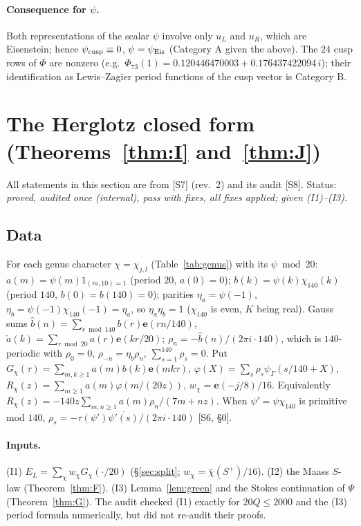 \documentclass[11pt]{article}
\theoremstyle{definition}
\theoremstyle{plain}
\newcommand{\e}{\mathbf{e}}
\newcommand{\src}[1]{\textup{[S#1]}}
\begin{document}
\paragraph{Consequence for $\psi$.} Both representations of the scalar $\psi$ involve only $u_L$ and $u_R$, which are Eisenstein; hence
$\psi_{\rm cusp}\equiv0$, $\psi=\psi_{\rm Eis}$ (Category A given the above). The $24$ cusp rows of $\Phi$ are nonzero (e.g.\
$\Phi_{73}(1)=0.120446470003+0.176437422094\,i$); their identification as Lewis--Zagier period functions of the cusp vector is Category B.

\section{The Herglotz closed form (Theorems~\ref{thm:I} and~\ref{thm:J})}\label{sec:herglotz}
All statements in this section are from \src{7} (rev.~2) and its audit \src{8}. Status: \emph{proved, audited once (internal), pass with
fixes, all fixes applied; given (I1)--(I3)}.

\subsection{Data}
For each genus character $\chi=\chi_{j,l}$ (Table~\ref{tab:genus}) with its $\psi\bmod20$: $a(m)=\psi(m)1_{(m,10)=1}$ (period $20$, $a(0)=0$);
$b(k)=\psi(k)\chi_{140}(k)$ (period $140$, $b(0)=b(140)=0$); parities $\eta_a=\psi(-1)$, $\eta_b=\psi(-1)\chi_{140}(-1)=\eta_a$, so
$\eta_a\eta_b=1$ ($\chi_{140}$ is even, $K$ being real). Gauss sums
$\widehat b(n)=\sum_{r\bmod140}b(r)\e(rn/140)$, $\check a(k)=\sum_{r\bmod20}a(r)\e(kr/20)$; $\rho_n=-\widehat b(n)/(2\pi i\cdot140)$, which is
$140$-periodic with $\rho_0=0$, $\rho_{-n}=\eta_b\rho_n$, $\sum_{s=1}^{140}\rho_s=0$. Put $G_\chi(\tau)=\sum_{m,k\ge1}a(m)b(k)\e(mk\tau)$,
$\varphi(X)=\sum_s\rho_s\psi_\Gamma(s/140+X)$, $R_\chi(z)=\sum_{m\ge1}a(m)\varphi(m/(20z))$, $w_\chi=\e(-j/8)/16$. Equivalently
$R_\chi(z)=-140z\sum_{m,n\ge1}a(m)\rho_n/(7m+nz)$. When $\psi'=\psi\chi_{140}$ is primitive mod $140$, $\rho_s=-\tau(\psi')\overline{\psi'(s)}/(2\pi i\cdot140)$
\src{6, \S0}.

\paragraph{Inputs.} (I1) $E_L=\sum_\chi w_\chi G_\chi(\cdot/20)$ (\S\ref{sec:split}; $w_\chi=\bar\chi(S^+)/16$). (I2) the Maass $S$-law
(Theorem~\ref{thm:F}). (I3) Lemma~\ref{lem:green} and the Stokes continuation of $\Psi$ (Theorem~\ref{thm:G}). The audit checked (I1) exactly for
$20Q\le2000$ and the (I3) period formula numerically, but did not re-audit their proofs.
\end{document}
